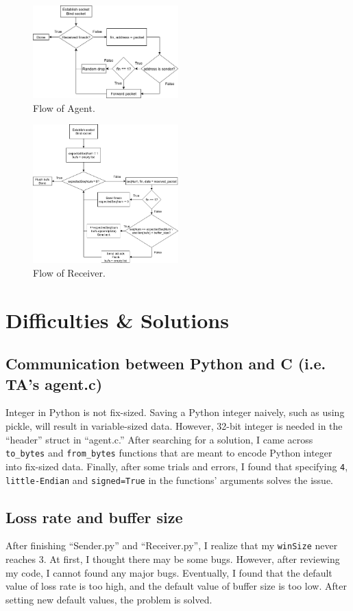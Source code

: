 \documentclass{article}
\begin{document}
\begin{figure}[h]
 \centering
 \includegraphics[width=0.5\textwidth]{Agent.png}
 \caption{Flow of Agent.}
\end{figure}

\begin{figure}[h]
 \centering
 \includegraphics[width=0.5\textwidth]{Receiver.png}
 \caption{Flow of Receiver.}
\end{figure}

\newpage
\section{Difficulties \& Solutions}
\subsection{Communication between Python and C (i.e. TA's agent.c)}
Integer in Python is not fix-sized.
Saving a Python integer naively, such as using pickle, will result in variable-sized data.
However, 32-bit integer is needed in the ``header'' struct in ``agent.c.''
After searching for a solution, I came across \texttt{to\_bytes} and \texttt{from\_bytes} functions that are meant to encode Python integer into fix-sized data.
Finally, after some trials and errors, I found that specifying \texttt{4}, \texttt{little-Endian} and \texttt{signed=True} in the functions' arguments solves the issue.

\subsection{Loss rate and buffer size}
After finishing ``Sender.py'' and ``Receiver.py'', I realize that my \texttt{winSize} never reaches 3.
At first, I thought there may be some bugs.
However, after reviewing my code, I cannot found any major bugs.
Eventually, I found that the default value of loss rate is too high, and the default value of buffer size is too low.
After setting new default values, the problem is solved.
\end{document}
